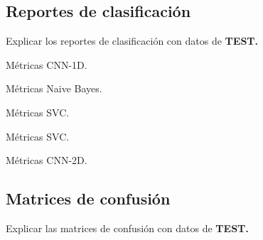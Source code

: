   \subsection{Reportes de clasificación}

    Explicar los reportes de clasificación con datos de \textbf{TEST.}

    \begin{table}[H]
      \centering
      \caption{Métricas CNN-1D.}
      \label{CNN1DMetrics}
    \end{table}

    \begin{table}[H]
      \centering
      \caption{Métricas Naive Bayes.}
      \label{NBMetrics}
    \end{table}

    \begin{table}[H]
      \centering
      \caption{Métricas SVC.}
      \label{SVCDMetrics}
    \end{table}

    \begin{table}[H]
      \centering
      \caption{Métricas SVC.}
      \label{SVCDMetrics}
    \end{table}

    \begin{table}[H]
      \centering
      \caption{Métricas CNN-2D.}
      \label{CNN2DMetrics}
    \end{table}

  \subsection{Matrices de confusión}

    Explicar las matrices de confusión con datos de \textbf{TEST.}


